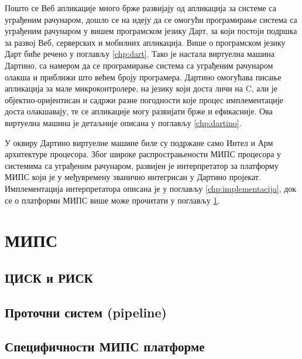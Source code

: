 \documentclass[12pt,oneside]{memoir}
\begin{document}
Пошто се Веб апликације много брже развијају од апликација за системе са уграђеним рачунаром, дошло се на идеју да се омогући програмирање система са уграђеним рачунаром у вишем програмском језику Дарт, за који постоји подршка за развој Веб, серверских и мобилних апликација. Више о програмском језику Дарт биће речено у поглављу \ref{chp:dart}. Тако је настала виртуелна машина Дартино, са намером да се програмирање система са уграђеним рачунаром олакша и приближи што већем броју програмера. Дартино омогућава писање апликација за мале микроконтролере, на језику који доста личи на C, али је објектно-оријентисан и садржи разне погодности које процес имплементације доста олакшавају, те се апликације могу развијати брже и ефикасније. Ова виртуелна машина је детаљније описана у поглављу \ref{chp:dartino}.

У оквиру Дартино виртуелне машине биле су подржане само Интел и Арм архитектуре процесора. Због широке распрострањености МИПС процесора у системима са уграђеним рачунаром, развијен је интерпретатор за платформу МИПС који је у међувремену званично интегрисан у Дартино пројекат. Имплементација интерпретатора описана је у поглављу \ref{chp:implementacija}, док се о платформи МИПС више може прочитати у поглављу \ref{chp:mips}.\\




\chapter{МИПС}
\label{chp:mips}

\section{ЦИСК и РИСК}

\section{Проточни систем (pipeline)}

\section{Специфичности МИПС платформе}
\end{document}
